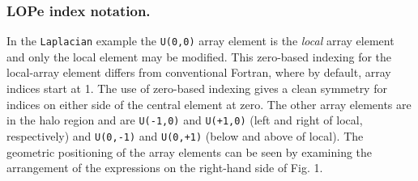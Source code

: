 \vspace{-.3in}

\subsubsection{LOPe index notation.}

In the \texttt{Laplacian} example the \texttt{U(0,0)} array element is the \emph{local} array
element and only the local element may be modified.  This zero-based indexing for the local-array
element differs from conventional Fortran, where by default, array indices start at 1.  The use of
zero-based indexing gives a clean symmetry for indices on either side of the central element at
zero. The other array elements are in the halo region and are \texttt{U(-1,0)} and
\texttt{U(+1,0)} (left and right of local, respectively) and \texttt{U(0,-1)} and \texttt{U(0,+1)}
(below and above of local).  The geometric positioning of the array elements can be
seen by examining the arrangement of the expressions on the right-hand side of Fig. 1.
